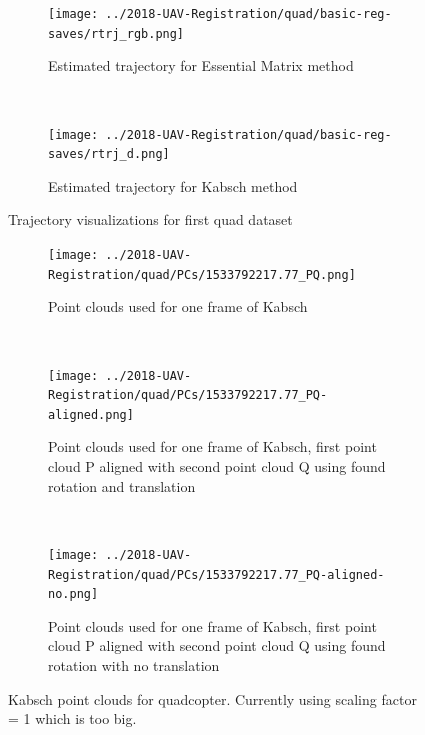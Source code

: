 \documentclass[12pt,a4paper]{article}
\begin{document}
\begin{figure}[h]
  \begin{subfigure}[t]{0.5\textwidth}
  \centering
    \texttt{[image: ../2018-UAV-Registration/quad/basic-reg-saves/rtrj\_rgb.png]}
  \caption{Estimated trajectory for Essential Matrix method}
  \end{subfigure}%
  ~
  \begin{subfigure}[t]{0.5\textwidth}
  \centering
    \texttt{[image: ../2018-UAV-Registration/quad/basic-reg-saves/rtrj\_d.png]}
  \caption{Estimated trajectory for Kabsch method}
  \end{subfigure}
  \caption{Trajectory visualizations for first quad dataset}
  \label{f: quad1 trj}
\end{figure}

\begin{figure}[p]
  \centering
  \begin{subfigure}[t]{\textwidth}
  \centering
  \texttt{[image: ../2018-UAV-Registration/quad/PCs/1533792217.77\_PQ.png]}
  \caption{Point clouds used for one frame of Kabsch}
  \end{subfigure}
  \\
  \begin{subfigure}[t]{0.5\textwidth}
  \centering
  \texttt{[image: ../2018-UAV-Registration/quad/PCs/1533792217.77\_PQ-aligned.png]}
  \caption{Point clouds used for one frame of Kabsch, first point cloud P aligned with second point cloud Q using found rotation and translation}
  \end{subfigure}%
  ~
    \begin{subfigure}[t]{0.5\textwidth}
  \centering
  \texttt{[image: ../2018-UAV-Registration/quad/PCs/1533792217.77\_PQ-aligned-no.png]}
  \caption{Point clouds used for one frame of Kabsch, first point cloud P aligned with second point cloud Q using found rotation with no translation}
  \end{subfigure}
  \caption{Kabsch point clouds for quadcopter. Currently using scaling factor = 1 which is too big.}
  \label{f: Kabsch quad good}
\end{figure}
\end{document}
